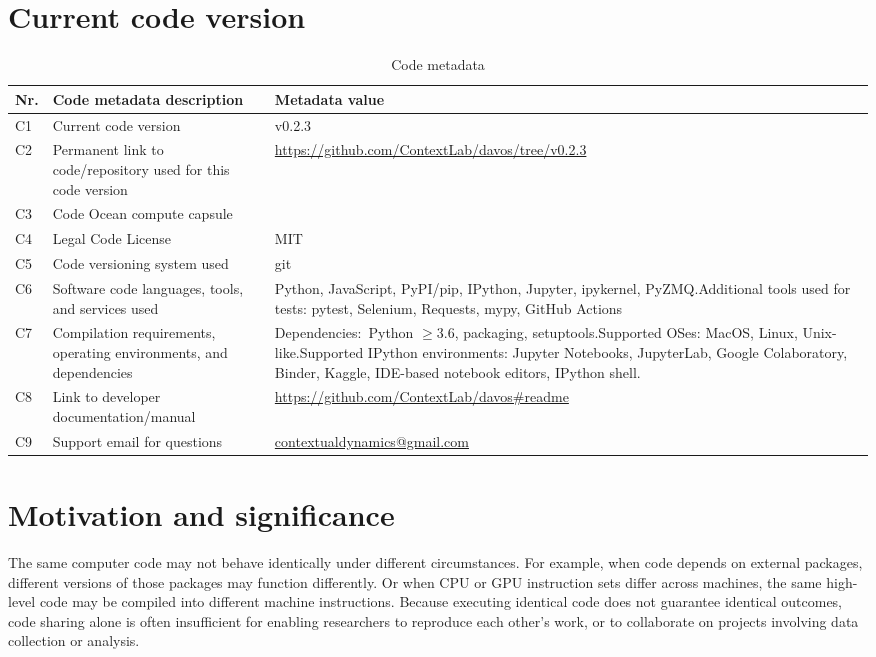 \documentclass[preprint,12pt,a4paper]{elsarticle}
\begin{document}
\section*{Current code version}

\begin{table}[H]
\begin{tabular}{|l|p{6.5cm}|p{6.5cm}|}
\hline
\textbf{Nr.} & \textbf{Code metadata description} & \textbf{Metadata value} \\
\hline
C1 & Current code version &  v0.2.3 \\
\hline
C2 & Permanent link to code/repository used for this code version & \url{https://github.com/ContextLab/davos/tree/v0.2.3} \\
\hline
C3 & Code Ocean compute capsule & \\
\hline
C4 & Legal Code License & MIT \\
\hline
C5 & Code versioning system used & git \\
\hline
C6 & Software code languages, tools, and services used & Python, JavaScript, PyPI/pip, IPython, Jupyter, ipykernel, PyZMQ.\newline Additional tools used for tests: pytest, Selenium, Requests, mypy, GitHub Actions \\
\hline
C7 & Compilation requirements, operating environments, and
     dependencies & Dependencies:~Python $\geq 3.6$, packaging, setuptools.\newline Supported OSes: MacOS, Linux, Unix-like.\newline Supported IPython environments: Jupyter Notebooks, JupyterLab, Google Colaboratory, Binder, Kaggle, IDE-based notebook editors, IPython shell. \\
\hline
C8 & Link to developer documentation/manual & \url{https://github.com/ContextLab/davos\#readme} \\
\hline
C9 & Support email for questions & \href{mailto:contextualdynamics@gmail.com}{contextualdynamics@gmail.com} \\
\hline
\end{tabular}
\caption{Code metadata}
\label{}
\end{table}

\linenumbers


\section{Motivation and significance}

The same computer code may not behave identically under different
circumstances.  For example, when code depends on external packages,
different versions of those packages may function differently.  Or
when CPU or GPU instruction sets differ across machines, the same
high-level code may be compiled into different machine instructions.
Because executing identical code does not guarantee identical
outcomes, code sharing alone is often insufficient for enabling
researchers to reproduce each other's work, or to collaborate on
projects involving data collection or analysis.
\end{document}

